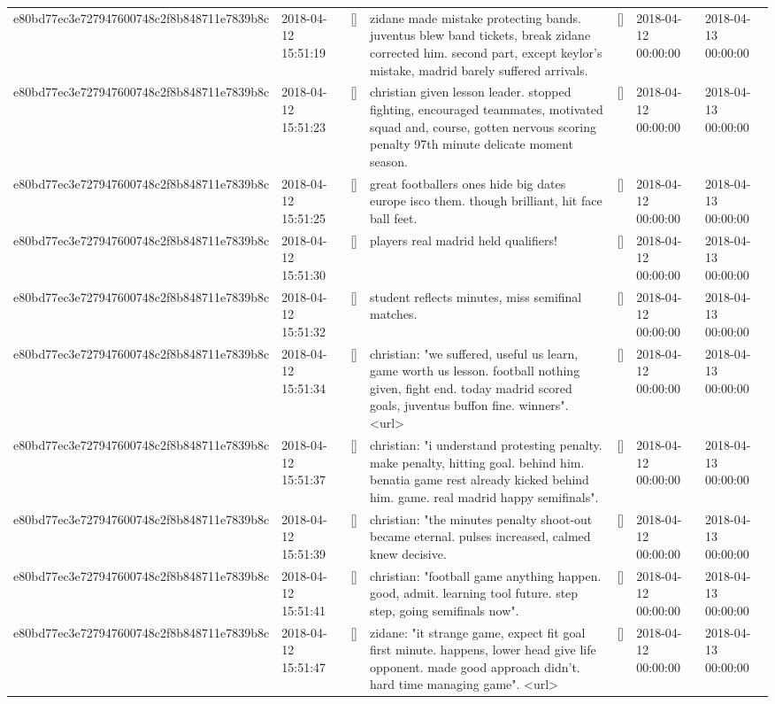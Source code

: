 \begin{tabular}{lllllll}
e80bd77ec3e727947600748c2f8b848711e7839b8c & 2018-04-12 15:51:19 & [] & zidane made mistake protecting bands. juventus blew band tickets, break zidane corrected him. second part, except keylor's mistake, madrid barely suffered arrivals. & [] & 2018-04-12 00:00:00 & 2018-04-13 00:00:00 \\
e80bd77ec3e727947600748c2f8b848711e7839b8c & 2018-04-12 15:51:23 & [] & christian given lesson leader. stopped fighting, encouraged teammates, motivated squad and, course, gotten nervous scoring penalty 97th minute delicate moment season. & [] & 2018-04-12 00:00:00 & 2018-04-13 00:00:00 \\
e80bd77ec3e727947600748c2f8b848711e7839b8c & 2018-04-12 15:51:25 & [] & great footballers ones hide big dates europe isco them. though brilliant, hit face ball feet. & [] & 2018-04-12 00:00:00 & 2018-04-13 00:00:00 \\
e80bd77ec3e727947600748c2f8b848711e7839b8c & 2018-04-12 15:51:30 & [] & players real madrid held qualifiers! & [] & 2018-04-12 00:00:00 & 2018-04-13 00:00:00 \\
e80bd77ec3e727947600748c2f8b848711e7839b8c & 2018-04-12 15:51:32 & [] & student reflects minutes, miss semifinal matches. & [] & 2018-04-12 00:00:00 & 2018-04-13 00:00:00 \\
e80bd77ec3e727947600748c2f8b848711e7839b8c & 2018-04-12 15:51:34 & [] & christian: "we suffered, useful us learn, game worth us lesson. football nothing given, fight end. today madrid scored goals, juventus buffon fine. winners". <url> & [] & 2018-04-12 00:00:00 & 2018-04-13 00:00:00 \\
e80bd77ec3e727947600748c2f8b848711e7839b8c & 2018-04-12 15:51:37 & [] & christian: "i understand protesting penalty. make penalty, hitting goal. behind him. benatia game rest already kicked behind him. game. real madrid happy semifinals". & [] & 2018-04-12 00:00:00 & 2018-04-13 00:00:00 \\
e80bd77ec3e727947600748c2f8b848711e7839b8c & 2018-04-12 15:51:39 & [] & christian: "the minutes penalty shoot-out became eternal. pulses increased, calmed knew decisive. & [] & 2018-04-12 00:00:00 & 2018-04-13 00:00:00 \\
e80bd77ec3e727947600748c2f8b848711e7839b8c & 2018-04-12 15:51:41 & [] & christian: "football game anything happen. good, admit. learning tool future. step step, going semifinals now". & [] & 2018-04-12 00:00:00 & 2018-04-13 00:00:00 \\
e80bd77ec3e727947600748c2f8b848711e7839b8c & 2018-04-12 15:51:47 & [] & zidane: "it strange game, expect fit goal first minute. happens, lower head give life opponent. made good approach didn't. hard time managing game". <url> & [] & 2018-04-12 00:00:00 & 2018-04-13 00:00:00 \\

\end{tabular}
